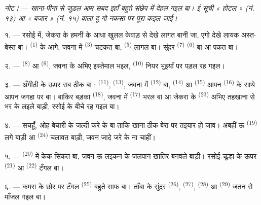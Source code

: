 \textit{नोट।} --- \textit{खाना-पीना से जुड़ल आम सबद इहाँ बहुते
संछेप में देहल गइल बा। ई सूची « होटल » (नं. १३) आ « बजार » (नं. १५)
वाला दू गो नकसा पर पूरा कइल जाई।}

\VUsaut{4.6mm}
\VUsaut{3.0mm}

१. --- रसोई में, जेकरा के हमनी के आधा खुलल केवाड़ से देखे लागत बानी जा,
एगो देखे लायक अस्त-बेस्त बा।  \textsuperscript{(1)} के
आगे, जवना में  \textsuperscript{(3)} चटकत बा,  \textsuperscript{(5)} लागल बा। सुंदर 
\textsuperscript{(7)}  \textsuperscript{(6)} बा आ पकत
बा।

२. ---  \textsuperscript{(8)} आ 
\textsuperscript{(9)}, जवना के अभिए इस्तेमाल भइल, 
\textsuperscript{(10)} नियर भुइयाँ पर पड़ल रह गइल।

३. --- अँगीठी के ऊपर सब ठीक बा :  \textsuperscript{(11)},
 \textsuperscript{(13)}, जवना में
 \textsuperscript{(12)} बा, 
\textsuperscript{(14)} आ  \textsuperscript{(15)} आपन
 \textsuperscript{(16)} के साथे आपन जगहा पर बा। बाकिर
बड़का  \textsuperscript{(18)}, जवना में
 \textsuperscript{(17)} भरल बा आ जेकरा के
 \textsuperscript{(23)} अभिए तहखाना से भर के लइले बाड़ी,
रसोई के बीचे रह गइल बा।

४. --- सचहूँ, ओह बेचारी के जल्दी करे के बा ताकि खाना ठीक बेरा पर तइयार
हो जाव। अबहीं ऊ  \textsuperscript{(19)} लगे बाड़ी आ
 \textsuperscript{(24)} चलावत बाड़ी, जवन जादे जरे के ना
चाहीं।

५. ---  \textsuperscript{(20)} में केक सिंकत बा, जवन ऊ
लइकन के जलपान खातिर बनवले बाड़ी। रसोई-चूल्हा के ऊपर 
\textsuperscript{(21)} आ  \textsuperscript{(22)} टँगल
बा।

\VUsaut{4.0mm}
\VUsaut{3.0mm}

६. --- कमरा के छोर पर टँगल  \textsuperscript{(25)}
बहुते साफ बा। ताँबा के सुंदर  \textsuperscript{(26)},
 \textsuperscript{(27)}, 
\textsuperscript{(28)} आ  \textsuperscript{(29)} जतन से
माँजल गइल बा।

